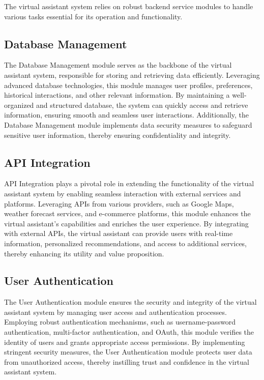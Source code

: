\documentclass[12pt,a4paper]{report}
\begin{document}
The virtual assistant system relies on robust backend service modules to handle various tasks essential for its operation and functionality.

\subsection{Database Management}

The Database Management module serves as the backbone of the virtual assistant system, responsible for storing and retrieving data efficiently. Leveraging advanced database technologies, this module manages user profiles, preferences, historical interactions, and other relevant information. By maintaining a well-organized and structured database, the system can quickly access and retrieve information, ensuring smooth and seamless user interactions. Additionally, the Database Management module implements data security measures to safeguard sensitive user information, thereby ensuring confidentiality and integrity.

\subsection{API Integration}

API Integration plays a pivotal role in extending the functionality of the virtual assistant system by enabling seamless interaction with external services and platforms. Leveraging APIs from various providers, such as Google Maps, weather forecast services, and e-commerce platforms, this module enhances the virtual assistant's capabilities and enriches the user experience. By integrating with external APIs, the virtual assistant can provide users with real-time information, personalized recommendations, and access to additional services, thereby enhancing its utility and value proposition.

\subsection{User Authentication}

The User Authentication module ensures the security and integrity of the virtual assistant system by managing user access and authentication processes. Employing robust authentication mechanisms, such as username-password authentication, multi-factor authentication, and OAuth, this module verifies the identity of users and grants appropriate access permissions. By implementing stringent security measures, the User Authentication module protects user data from unauthorized access, thereby instilling trust and confidence in the virtual assistant system.
\end{document}
